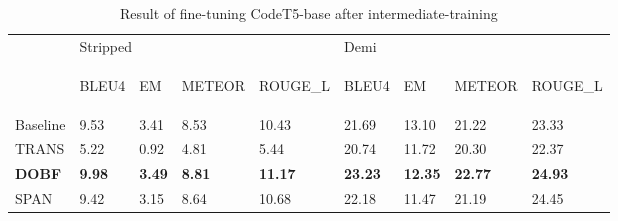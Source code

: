 \begin{table}[tbh]
\centering
\begin{tabular}{l|llll|llll}
\rowcolor[rgb]{0.749,0.749,0.749} \multicolumn{1}{l}{} & \multicolumn{4}{l|}{Stripped}                                                                                                                        & Demi                               &                                  &                                      &                                       \\ 
\cline{2-9}
\begin{sideways}\textbf{}\end{sideways}                & \begin{sideways}BLEU4\end{sideways} & \begin{sideways}EM\end{sideways} & \begin{sideways}METEOR\end{sideways} & \begin{sideways}ROUGE\_L\end{sideways} & \begin{sideways}BLEU4\end{sideways} & \begin{sideways}EM\end{sideways} & \begin{sideways}METEOR\end{sideways} & \begin{sideways}ROUGE\_L\end{sideways}  \\ 
\hline
Baseline                                               & 9.53                                & 3.41                          & 8.53                                & 10.43                                   & 21.69                              & 13.10  & 21.22                                & 23.33                                                           \\
TRANS                                                  & 5.22                                & 0.92     & 4.81  &  5.44                                                       & 20.74                              & 11.72                               & 20.30  &  22.37                               \\
\textbf{DOBF}                                          & \textbf{9.98}                       & \textbf{3.49}                    & \textbf{8.81}                       & \textbf{11.17}                       & \textbf{23.23}                     & \textbf{12.35}                   & \textbf{22.77}                       & \textbf{24.93}                        \\
SPAN                                                   & 9.42                                & 3.15                             & 8.64  &  10.68                                & 22.18                              & 11.47                            & 21.19                                &   24.45                              
\end{tabular}
\caption{Result of fine-tuning CodeT5-base after intermediate-training}
\label{tab:intermediate}
\end{table}
